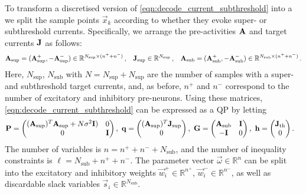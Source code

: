 To transform a discretised version of \cref{eqn:decode_current_subthreshold} into a \qprog we split the sample points $\vec x_k$ according to whether they evoke super- or subthreshold currents.
Specifically, we arrange the pre-activities $\mathbf{A}$ and target currents $\mathbf{J}$ as follows:
\begin{align*}
	\mathbf{A}_\mathrm{sup} = (
		  \mathbf{A}^+_\mathrm{sup}, 
		- \mathbf{A}^-_\mathrm{sup})
		\in
		\mathbb{R}^{N_\mathrm{sup} \times (n^+ + n^-)} \,,
	&&
	\mathbf{J}_\mathrm{sup} \in \mathbb{R}^{N_\mathrm{sup}} \,,
	&&
	\mathbf{A}_\mathrm{sub} = (
		  \mathbf{A}^+_\mathrm{sub}, 
		- \mathbf{A}^-_\mathrm{sub})
		\in
		\mathbb{R}^{N_\mathrm{sub} \times (n^+ + n^-)} \,.
\end{align*}
Here, $N_\mathrm{sup}$, $N_\mathrm{sub}$ with $N = N_\mathrm{sup} + N_\mathrm{sup}$
are the number of samples with a super- and subthreshold target currents, and, as before, $n^+$ and $n^-$ correspond to the number of excitatory and inhibitory pre-neurons.
Using these matrices, \cref{eqn:decode_current_subthreshold} can be expressed as a QP by letting
\begingroup
\setlength\fboxsep{2pt}
\newcommand{\cA}{LightSkyBlue}
\newcommand{\cB}{Plum}
\newcommand{\cC}{Salmon}
\newcommand{\cD}{Khaki}
\newcommand{\hlA}[1]{{\ensuremath{#1}}}
\newcommand{\hlB}[1]{{\ensuremath{#1}}}
\newcommand{\hlC}[1]{{\ensuremath{#1}}}
\newcommand{\hlD}[1]{{\ensuremath{#1}}}
\begin{align}
	\mat P &= \begin{pmatrix}
		  \hlA{(\mat A_\mathrm{sup})^T \mat A_\mathrm{sup} + N \sigma^2 \mat I)}
		& 0 \\
		  0
		& \hlB{\mat I}
	\end{pmatrix} ,
	&
	\!\!\! \vec q &= \begin{pmatrix}
		\hlA{(\mat A_\mathrm{sup})^T \vec J_\mathrm{sup}} \\
	0
	\end{pmatrix} ,
	&
	\!\!\! \mat G &= \begin{pmatrix}
		\hlC{\mat A_\mathrm{sub}} & \hlB{\mat I} \\
		\hlD{-\mat I} & 0
	\end{pmatrix} ,
	&
	\!\!\! \vec h &= \begin{pmatrix}
		\hlC{\vec{J}_\mathrm{th}} \\
		\hlD{0}
	\end{pmatrix} .
	\label{eqn:decode_subthreshold_qp}
\end{align}
The number of variables is $n = n^+ + n^- + N_\mathrm{sub}$, and the number of inequality constraints is $\ell = N_\mathrm{sub} + n^+ + n^-$.
The parameter vector $\vec \omega \in \mathbb{R}^{n}$ can be split into the excitatory and inhibitory weights $\vec w_i^+ \in \mathbb{R}^{n^+}$, $\vec w_i^- \in \mathbb{R}^{n^-}$, as well as discardable slack variables $\vec s_i \in \mathbb{R}^{N_\mathrm{sub}}$.

